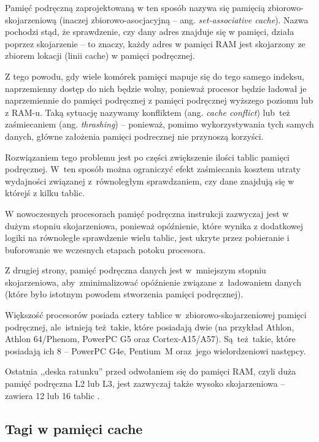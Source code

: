 Pamięć podręczną zaprojektowaną w ten sposób nazywa się pamięcią zbiorowo-skojarzeniową (inaczej zbiorowo-asocjacyjną -- ang. \textit{set-associative cache}). Nazwa pochodzi stąd, że sprawdzenie, czy dany adres znajduje się w pamięci, działa poprzez skojarzenie -- to znaczy, każdy adres w pamięci RAM jest skojarzony ze zbiorem lokacji (linii cache) w pamięci podręcznej.

Z tego powodu, gdy wiele komórek pamięci mapuje się do tego samego indeksu, naprzemienny dostęp do nich będzie wolny, ponieważ procesor będzie ładował je naprzemiennie do pamięci podręcznej z pamięci podręcznej wyższego poziomu lub z RAM-u. Taką sytuację nazywamy konfliktem (ang. \textit{cache conflict}) lub~też zaśmiecaniem (ang. \textit{thrashing}) -- ponieważ, pomimo wykorzystywania tych samych danych, główne założenia pamięci podrecznej nie przynoszą korzyści.

Rozwiązaniem tego problemu jest po części zwiększenie ilości tablic pamięci podręcznej. W~ten sposób można ograniczyć efekt zaśmiecania kosztem utraty wydajności związanej z~równoległym sprawdzaniem, czy dane znajdują się w którejś z kilku tablic.

W nowoczesnych procesorach pamięć podręczna instrukcji zazwyczaj jest w dużym stopniu skojarzeniowa, ponieważ opóźnienie, które wynika z dodatkowej logiki na równoległe sprawdzenie wielu tablic, jest ukryte przez pobieranie i buforowanie we wczesnych etapach potoku procesora.

Z drugiej strony, pamięć podręczna danych jest w~mniejszym stopniu skojarzeniowa, aby~zminimalizować opóźnienie związane z~ładowaniem danych (które było istotnym powodem stworzenia pamięci podręcznej).

Większość procesorów posiada cztery tablice w~zbiorowo-skojarzeniowej pamięci podręcznej, ale~istnieją też~takie, które posiadają dwie (na przykład Athlon, Athlon 64/Phenom, PowerPC G5 oraz Cortex-A15/A57). Są~też~takie, które posiadają ich 8 -- PowerPC G4e, Pentium~M oraz~jego wielordzeniowi następcy.

Ostatnia ,,deska ratunku'' przed odwołaniem się do pamięci RAM, czyli duża pamięć podręczna L2 lub L3, jest zazwyczaj także wysoko skojarzeniowa -- zawiera 12 lub 16 tablic \cite{ModernMicroprocessors90MinGuide}.


\subsection{Tagi w pamięci cache}

